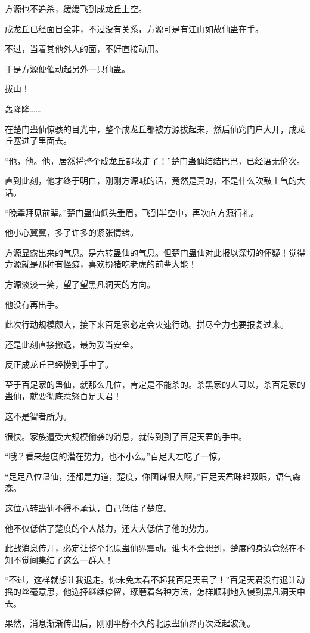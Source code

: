 \begin{this_body}
方源也不追杀，缓缓飞到成龙丘上空。

成龙丘已经面目全非，不过没有关系，方源可是有江山如故仙蛊在手。

不过，当着其他外人的面，不好直接动用。

于是方源便催动起另外一只仙蛊。

拔山！

轰隆隆……

在楚门蛊仙惊骇的目光中，整个成龙丘都被方源拔起来，然后仙窍门户大开，成龙丘塞进了里面去。

“他，他。他，居然将整个成龙丘都收走了！”楚门蛊仙结结巴巴，已经语无伦次。

直到此刻，他才终于明白，刚刚方源喊的话，竟然是真的，不是什么吹鼓士气的大话。

“晚辈拜见前辈。”楚门蛊仙低头垂眉，飞到半空中，再次向方源行礼。

他小心翼翼，多了许多的紧张情绪。

方源显露出来的气息。是六转蛊仙的气息。但楚门蛊仙对此报以深切的怀疑！觉得方源就是那种有怪癖，喜欢扮猪吃老虎的前辈大能！

方源淡淡一笑，望了望黑凡洞天的方向。

他没有再出手。

此次行动规模颇大，接下来百足家必定会火速行动。拼尽全力也要报复过来。

还是此刻直接撤退，最为妥当安全。

反正成龙丘已经捞到手中了。

至于百足家的蛊仙，就那么几位，肯定是不能杀的。杀黑家的人可以，杀百足家的蛊仙，就要彻底惹怒百足天君！

这不是智者所为。

很快。家族遭受大规模偷袭的消息，就传到到了百足天君的手中。

“哦？看来楚度的潜在势力，也不小么。”百足天君吃了一惊。

“足足八位蛊仙，还都是力道，楚度，你图谋很大啊。”百足天君眯起双眼，语气森森。

这位八转蛊仙不得不承认，自己低估了楚度。

他不仅低估了楚度的个人战力，还大大低估了他的势力。

此战消息传开，必定让整个北原蛊仙界震动。谁也不会想到，楚度的身边竟然在不知不觉间集结了这么一群人！

“不过，这样就想让我退走。你未免太看不起我百足天君了！”百足天君没有退让动摇的丝毫意思，他选择继续停留，琢磨着各种方法，怎样顺利地入侵到黑凡洞天中去。

果然，消息渐渐传出后，刚刚平静不久的北原蛊仙界再次泛起波澜。


\end{this_body}
